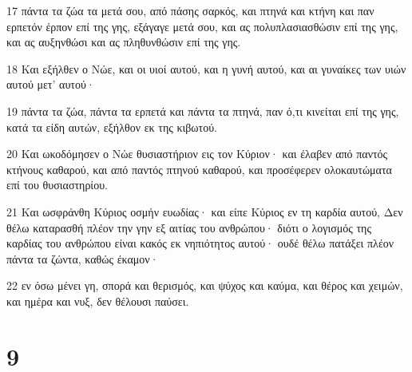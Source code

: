 \par 17 πάντα τα ζώα τα μετά σου, από πάσης σαρκός, και πτηνά και κτήνη και παν ερπετόν έρπον επί της γης, εξάγαγε μετά σου, και ας πολυπλασιασθώσιν επί της γης, και ας αυξηνθώσι και ας πληθυνθώσιν επί της γης.
\par 18 Και εξήλθεν ο Νώε, και οι υιοί αυτού, και η γυνή αυτού, και αι γυναίκες των υιών αυτού μετ' αυτού·
\par 19 πάντα τα ζώα, πάντα τα ερπετά και πάντα τα πτηνά, παν ό,τι κινείται επί της γης, κατά τα είδη αυτών, εξήλθον εκ της κιβωτού.
\par 20 Και ωκοδόμησεν ο Νώε θυσιαστήριον εις τον Κύριον· και έλαβεν από παντός κτήνους καθαρού, και από παντός πτηνού καθαρού, και προσέφερεν ολοκαυτώματα επί του θυσιαστηρίου.
\par 21 Και ωσφράνθη Κύριος οσμήν ευωδίας· και είπε Κύριος εν τη καρδία αυτού, Δεν θέλω καταρασθή πλέον την γην εξ αιτίας του ανθρώπου· διότι ο λογισμός της καρδίας του ανθρώπου είναι κακός εκ νηπιότητος αυτού· ουδέ θέλω πατάξει πλέον πάντα τα ζώντα, καθώς έκαμον·
\par 22 εν όσω μένει γη, σπορά και θερισμός, και ψύχος και καύμα, και θέρος και χειμών, και ημέρα και νυξ, δεν θέλουσι παύσει.

\chapter{9}

